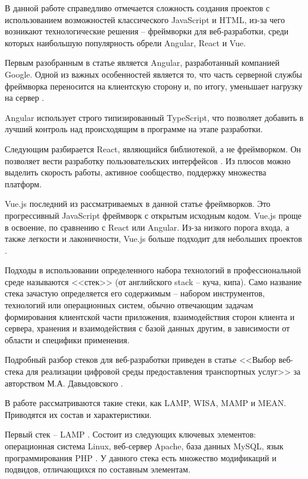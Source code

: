В данной работе справедливо отмечается сложность создания проектов с использованием возможностей классического JavaScript и HTML, из-за чего возникают технологические решения -- фреймворки для веб-разработки, среди которых наибольшую популярность обрели Angular, React и Vue.

Первым разобранным в статье является Angular, разработанный компанией Google.
Одной из важных особенностей является то, что часть серверной службы фреймворка переносится на клиентскую сторону и, по итогу, уменьшает нагрузку на сервер \cite{sergacheva-framework-1}.

Angular использует строго типизированный TypeScript, что позволяет добавить в лучший контроль над происходящим в программе на этапе разработки.

Следующим разбирается React, являющийся библиотекой, а не фреймворком.
Он позволяет вести разработку пользовательских интерфейсов \cite{sergacheva-framework-2}.
Из плюсов можно выделить скорость работы, активное сообщество, поддержку множества платформ.

Vue.js последний из рассматриваемых в данной статье фреймворков.
Это прогрессивный JavaScript фреймворк с открытым исходным кодом.
Vue.js проще в освоение, по сравнению с React или Angular.
Из-за низкого порога входа, а также легкости и лаконичности, Vue.js больше подходит для небольших проектов \cite{sergacheva-framework-4}.

Подходы в использовании определенного набора технологий в профессиональной среде называются <<стек>> (от английского stack -- куча, кипа).
Само название стека зачастую определяется его содержимым -- набором инструментов, технологий или операционных систем, обычно отвечающим  задачам формирования клиентской части приложения, взаимодействия сторон клиента и сервера, хранения и взаимодействия с базой данных другим, в зависимости от области и специфики применения.

Подробный разбор стеков для веб-разработки приведен в статье <<Выбор веб-стека для реализации цифровой среды предоставления транспортных услуг>> за авторством М.А. Давыдовского \cite{davidovsky-vibor}.

В работе рассматриваются такие стеки, как LAMP, WISA, MAMP и MEAN.
Приводятся их состав и характеристики.

Первый стек -- LAMP \cite{davidovsky-vibor-1}.
Состоит из следующих ключевых элементов: операционная система Linux, веб-сервер Apache, база данных MySQL, язык программирования PHP \cite{davidovsky-vibor-php}.
У данного стека есть множество модификаций и подвидов, отличающихся по составным элементам.

